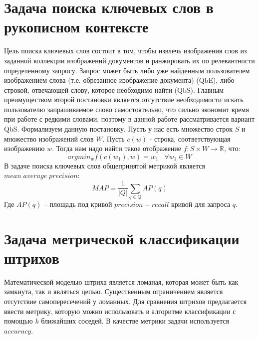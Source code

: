 \documentclass{article}
\begin{document}
\section{Задача поиска ключевых слов в рукописном контексте}
Цель поиска ключевых слов состоит в том, чтобы извлечь изображения слов из заданной коллекции изображений документов и ранжировать их по релевантности определенному запросу. Запрос может быть либо уже найденным пользователем изображением слова (т.е. обрезанное изображение документа) (QbE), либо строкой, отвечающей слову, которое необходимо найти (QbS). Главным преимуществом второй постановки является отсутствие необходимости искать пользователю запрашиваемое слово самостоятельно, что сильно экономит время при работе с редкими словами, поэтому в данной работе рассматривается вариант QbS. Формализуем данную постановку. Пусть у нас есть множество строк $S$ и множество изображений слов $W$. Пусть $c(w)$ - строка, соответствующая изображению $w$. Тогда нам надо найти такое отображение $f: S \times W \rightarrow \mathbb{R}$, что:
$$argmin_w f(c(w_1), w) = w_1\;\;\;\forall w_1 \in W$$
В задаче поиска ключевых слов общепринятой метрикой является  $mean\; average\; precision$:
$$MAP = \frac{1}{|Q|}\sum_{q \in Q}AP(q)$$
Где $AP(q)$ -- площадь под кривой $precision-recall$ кривой для запроса $q$.\\
\section{Задача метрической классификации штрихов}
Математической моделью штриха является ломаная, которая может быть как замкнута, так и являться цепью. Существенным ограничением является отсутствие самопересечений у ломанных. Для сравнения штрихов предлагается ввести метрику, которую можно использовать в алгоритме классификации с помощью $k$ ближайших соседей. В качестве метрики задачи используется $accuracy$.
\end{document}
